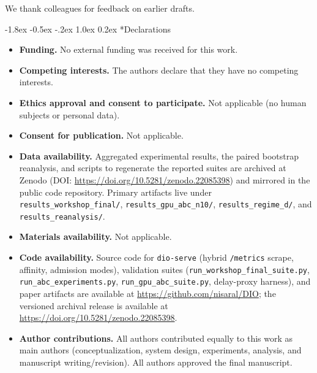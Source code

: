 \documentclass[pdflatex,sn-mathphys-num]{sn-jnl}
\makeatletter
\renewcommand{\section}{\@startsection{section}{1}{\z@}%
  {-1.8ex \@plus -0.5ex \@minus -.2ex}%
  {1.0ex \@plus 0.2ex}%
  {\needspace{4\baselineskip}\normalfont\large\bfseries}}%
\makeatother
\begin{document}
\backmatter

We thank colleagues for feedback on earlier drafts.

\section*{Declarations}

\begin{itemize}
\item \textbf{Funding.} No external funding was received for this work.
\item \textbf{Competing interests.} The authors declare that they have no
competing interests.
\item \textbf{Ethics approval and consent to participate.} Not applicable
(no human subjects or personal data).
\item \textbf{Consent for publication.} Not applicable.
\item \textbf{Data availability.} Aggregated experimental results, the paired
bootstrap reanalysis, and scripts to regenerate the reported suites are archived
at Zenodo (DOI: \url{https://doi.org/10.5281/zenodo.22085398}) and mirrored in the
public code repository. Primary artifacts live under
\texttt{results\_workshop\_final/}, \texttt{results\_gpu\_abc\_n10/},
\texttt{results\_regime\_d/}, and \texttt{results\_reanalysis/}.
\item \textbf{Materials availability.} Not applicable.
\item \textbf{Code availability.} Source code for \texttt{dio-serve} (hybrid
\texttt{/metrics} scrape, affinity, admission modes), validation suites
(\texttt{run\_workshop\_final\_suite.py}, \texttt{run\_abc\_experiments.py},
\texttt{run\_gpu\_abc\_suite.py}, delay-proxy harness), and paper artifacts are
available at \url{https://github.com/nisaral/DIO}; the versioned archival release
is available at \url{https://doi.org/10.5281/zenodo.22085398}.
\item \textbf{Author contributions.} All authors contributed equally to this work
as main authors (conceptualization, system design, experiments, analysis, and
manuscript writing/revision). All authors approved the final manuscript.
\end{itemize}
\end{document}
